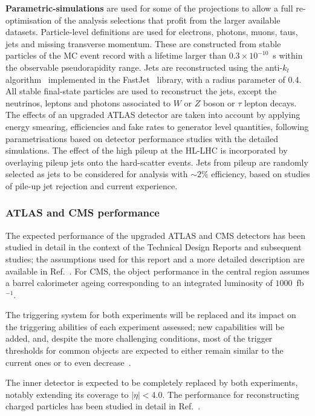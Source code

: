{\bf Parametric-simulations} are used for some of the projections to allow a full re-optimisation of the analysis selections that profit from the larger available datasets.
Particle-level definitions are used for electrons, photons, muons, taus, jets and missing transverse momentum. These are constructed from stable particles of the MC event record with a lifetime larger than $0.3 \times 10^{-10}$~s within the observable pseudorapidity range. Jets are reconstructed using the anti-$k_t$ algorithm~\cite{Cacciari:2008gp} implemented in the FastJet~\cite{fastjet} library, with a radius parameter of 0.4. All stable final-state particles are used to reconstruct the jets, except the neutrinos, leptons and photons associated to $W$ or $Z$ boson or $\tau$ lepton decays. The effects of an upgraded ATLAS detector are taken into account by applying energy smearing, efficiencies and fake rates to generator level quantities, following parametrisations based on detector performance studies with the detailed simulations. The effect of the high pileup at the HL-LHC is incorporated by overlaying pileup jets onto the hard-scatter events. Jets from pileup are randomly selected as jets to be considered for analysis with $\sim 2\%$ efficiency, based on studies of pile-up jet rejection and current experience.


\subsubsection{ATLAS and CMS performance}
\label{sec:methods:perf}

The expected performance of the upgraded ATLAS and CMS detectors has been studied in detail in the context of the Technical Design Reports
and subsequent studies; the assumptions used for this report and a more detailed description are available in Ref.~\cite{ATLAS_PERF_Note, Collaboration:2650976}. For CMS, the object performance in the central region assumes a barrel calorimeter ageing corresponding to an integrated luminosity of $1000$~fb$^{-1}$.

The triggering system for both experiments will be replaced and its impact on the triggering abilities of each experiment assessed;
new capabilities will be added, and, despite the more challenging conditions, most of the trigger thresholds for common objects are expected
to either remain similar to the current ones or to even decrease~\cite{ATLAS_TDAQ_TDR,CMSL1interim}.

The inner detector is expected to be completely replaced by both experiments, notably extending its coverage to $|\eta|<4.0$.
The performance for reconstructing charged particles has been studied in detail in Ref.~\cite{ATLAS_Pixel_TDR,ATLAS_Strip_TDR,CMS_Tracker_TDR}.

